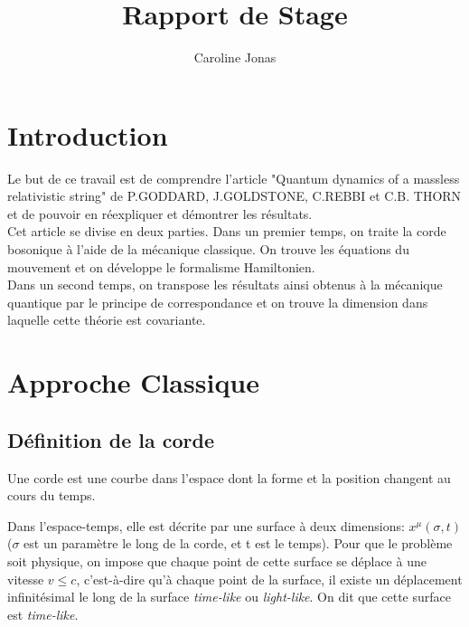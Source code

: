 \documentclass[a4paper,12pt]{article}
\title{Rapport de Stage}
\author{Caroline Jonas}
\begin{document}
\maketitle

\section{Introduction}
Le but de ce travail est de comprendre l'article "Quantum dynamics of a massless relativistic string" de P.GODDARD, J.GOLDSTONE, C.REBBI et C.B. THORN et de pouvoir en réexpliquer et démontrer les résultats.\\
Cet article se divise en deux parties. Dans un premier temps, on traite la corde bosonique à l'aide de la mécanique classique. On trouve les équations du mouvement et on développe le formalisme Hamiltonien.\\
Dans un second temps, on transpose les résultats ainsi obtenus à la mécanique quantique par le principe de correspondance et on trouve la dimension dans laquelle cette théorie est covariante. 
\section{Approche Classique}
\subsection{Définition de la corde}
Une corde est une courbe dans l'espace dont la forme et la position changent au cours du temps.

Dans l'espace-temps, elle est décrite par une surface à deux dimensions:
$x^{\mu}(\sigma,t)$ ($\sigma$ est un paramètre le long de la corde, et t est le temps).
Pour que le problème soit physique, on impose que chaque point de cette surface se déplace à une vitesse $v\leq c$, c'est-à-dire qu'à chaque point de la surface, il existe un déplacement infinitésimal le long de la surface \textit{time-like} ou \textit{light-like}. On dit que cette surface est \textit{time-like}.
\end{document}
